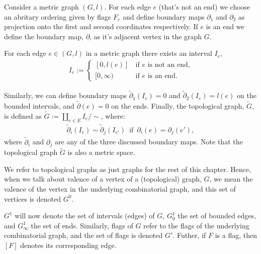 \begin{definition}
    Consider a metric graph $(G,l)$.
    For each edge $e$ (that's not an end) we choose an abritary ordering given by flags $F_{e}$ and define boundary maps $\partial_{1}$ and $\partial_{2}$ as projection onto the first and second coordinates respectively. 
    If $e$ is an end we define the boundary map, $\partial$, as it's adjacent vertex in the graph $G$.
    \par For each edge $e \in (G,l)$ in a metric graph there exists an interval $I_{e}$, 
    \begin{align*}
        I_e := 
        \begin{cases}
            [0,l(e)]\,& \text{if }e \text{ is not an end,}\\
            [0,\infty)\, & \text{if }e \text{ is an end}.
        \end{cases}
    \end{align*}
        \par Similarly, we can define boundary maps $\tilde \partial_{1}(I_{e}) = 0$ and $\tilde \partial_{2}(I_{e}) = l(e)$ on the bounded intervals, and  $\tilde \partial (e) = 0$ on the ends. 
        Finally, the topological graph, $\tilde G$, is defined as $\tilde G:=\coprod_{e \in E}I_{e}/\sim$, where:
        \begin{align*}
            \tilde \partial_{i} (I_{e}) \sim \tilde \partial_{j}(I_{e'}) \, \text{ if }\, \partial_{i} (e) =\partial_{j}(e'),
        \end{align*}
        where $\tilde \partial_{i}$ and $\partial_{j}$ are any of the three discussed boundary maps. Note that the topological graph $\tilde G$ is also a metric space.
\end{definition}

\begin{remark}
    We refer to topological graphs as just graphs for the rest of this chapter. 
    Hence, when we talk about valence of a vertex of a (topological) graph, $G$, we mean the valence of the vertex in the underlying combinatorial graph, and this set of vertices is denoted $G^{0}$.
    \par $G^{1}$ will now denote the set of intervals (edges) of $G$, $G^{1}_{0}$ the set of bounded edges, and $G^{1}_{\infty}$ the set of ends. 
    Similarly, flags of $G$ refer to the flags of the underlying combinatorial graph, and the set of flags is denoted $G'$. 
    Futher, if $F$ is a flag, then $[F]$ denotes its corresponding edge.
\end{remark}

